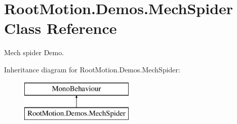 \hypertarget{class_root_motion_1_1_demos_1_1_mech_spider}{}\section{Root\+Motion.\+Demos.\+Mech\+Spider Class Reference}
\label{class_root_motion_1_1_demos_1_1_mech_spider}


Mech spider Demo.  


Inheritance diagram for Root\+Motion.\+Demos.\+Mech\+Spider\+:\begin{figure}[H]
\begin{center}
\leavevmode
\includegraphics[height=2.000000cm]{class_root_motion_1_1_demos_1_1_mech_spider}
\end{center}
\end{figure}
